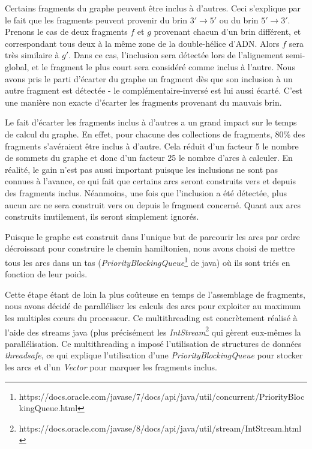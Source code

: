 \documentclass{article}
\begin{document}
Certains fragments du graphe peuvent être inclus à d'autres. Ceci s'explique par le fait que les fragments peuvent provenir du brin $3' \to 5'$ ou du brin $5' \to 3'$. Prenons le cas de deux fragments $f$ et $g$ provenant chacun d'un brin différent, et correspondant tous deux à la même zone de la double-hélice d'ADN. Alors $f$ sera très similaire à $g'$. Dans ce cas, l'inclusion sera détectée lors de l'alignement semi-global, et le fragment le plus court sera considéré comme inclus à l'autre. 
Nous avons pris le parti d'écarter du graphe un fragment dès que son inclusion à un autre fragment est détectée - le complémentaire-inversé est lui aussi écarté. C'est une manière non exacte d'écarter les fragments provenant du mauvais brin.

Le fait d'écarter les fragments inclus à d'autres a un grand impact sur le temps de calcul du graphe. En effet, pour chacune des collections de fragments, 80\% des fragments s'avéraient être inclus à d'autre. Cela réduit d'un facteur 5 le nombre de sommets du graphe et donc d'un facteur 25 le nombre d'arcs à calculer. En réalité, le gain n'est pas aussi important puisque les inclusions ne sont pas connues à l'avance, ce qui fait que certains arcs seront construits vers et depuis des fragments inclus. Néanmoins, une fois que l'inclusion a été détectée, plus aucun arc ne sera construit vers ou depuis le fragment concerné. Quant aux arcs construits inutilement, ils seront simplement ignorés.

Puisque le graphe est construit dans l'unique but de parcourir les arcs par ordre décroissant pour construire le chemin hamiltonien, nous avons choisi de mettre tous les arcs dans un tas (\textit{PriorityBlockingQueue}\footnote{https://docs.oracle.com/javase/7/docs/api/java/util/concurrent/PriorityBlockingQueue.html} de java) où ils sont triés en fonction de leur poids. 

Cette étape étant de loin la plus coûteuse en temps de l'assemblage de fragments, nous avons décidé de paralléliser les calculs des arcs pour exploiter au maximum les multiples cœurs du processeur. Ce multithreading est concrètement réalisé à l'aide des streams java (plus précisément les \textit{IntStream}\footnote{https://docs.oracle.com/javase/8/docs/api/java/util/stream/IntStream.html} qui gèrent eux-mêmes la parallélisation. Ce multithreading a imposé l'utilisation de structures de données \textit{threadsafe}, ce qui explique l'utilisation d'une \textit{PriorityBlockingQueue} pour stocker les arcs et d'un \textit{Vector} pour marquer les fragments inclus.
\end{document}
